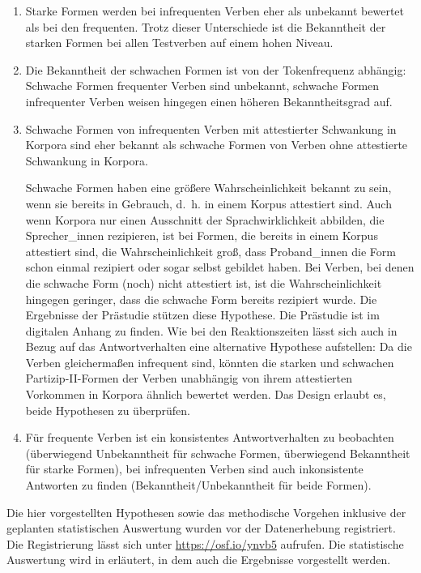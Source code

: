 \begin{enumerate}
\item Starke Formen werden bei infrequenten Verben eher als unbekannt bewertet als bei den frequenten. Trotz dieser Unterschiede ist die Bekanntheit der starken Formen bei allen Testverben auf einem hohen Niveau.
\item Die Bekanntheit der schwachen Formen ist von der Tokenfrequenz abhängig: Schwache Formen frequenter Verben sind unbekannt, schwache Formen infrequenter Verben weisen hingegen einen höheren Bekanntheitsgrad auf.
\item Schwache Formen von infrequenten Verben mit attestierter Schwankung in Korpora sind eher bekannt als schwache Formen von Verben ohne attestierte Schwankung in Korpora.

Schwache Formen haben eine größere Wahrscheinlichkeit bekannt zu sein, wenn sie bereits in Gebrauch, d.~h. in einem Korpus attestiert sind. Auch wenn Korpora nur einen Ausschnitt der Sprachwirklichkeit abbilden, die Sprecher\_innen rezipieren, ist bei Formen, die bereits in einem Korpus attestiert sind, die Wahrscheinlichkeit groß, dass Proband\_innen die Form schon einmal rezipiert oder sogar selbst gebildet haben. Bei Verben, bei denen die schwache Form (noch) nicht attestiert ist, ist die Wahrscheinlichkeit hingegen geringer, dass die schwache Form bereits rezipiert wurde. Die Ergebnisse der Prästudie stützen diese Hypothese. Die Prästudie ist im digitalen Anhang zu finden. Wie bei den Reaktionszeiten lässt sich auch in Bezug auf das Antwortverhalten eine alternative Hypothese aufstellen: Da die Verben gleichermaßen infrequent sind, könnten die starken und schwachen Partizip-II-Formen der Verben unabhängig von ihrem attestierten Vorkommen in Korpora ähnlich bewertet werden. Das Design erlaubt es, beide Hypothesen zu überprüfen.\largerpage

\item Für frequente Verben ist ein konsistentes Antwortverhalten zu beobachten (überwiegend Unbekanntheit für schwache Formen, überwiegend Bekanntheit für starke Formen), bei infrequenten Verben sind auch inkonsistente Antworten zu finden (Bekanntheit/Unbekanntheit für beide Formen).
\end{enumerate}

Die hier vorgestellten Hypothesen sowie das methodische Vorgehen inklusive der geplanten statistischen Auswertung wurden vor der Datenerhebung registriert. Die Registrierung lässt sich unter \url{https://osf.io/ynvb5} aufrufen. Die statistische Auswertung wird in  erläutert, in dem auch die Ergebnisse vorgestellt werden.

